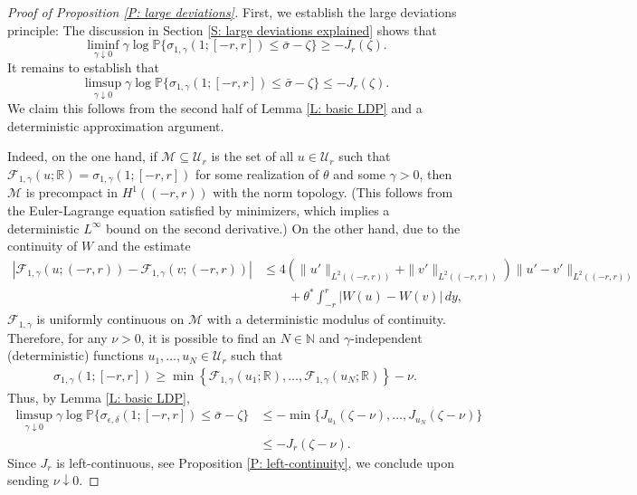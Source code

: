 \documentclass[10pt,a4paper]{amsart}
\begin{document}
	\begin{proof}[Proof of Proposition \ref{P: large deviations}] First, we establish the large deviations principle: The discussion in Section \ref{S: large deviations explained} shows that 
    \begin{equation*}
        \liminf_{\gamma \downarrow 0 } \gamma \log \mathbb{P} \{ \sigma_{1,\gamma}(1;[-r,r]) \leq \bar{\sigma} - \zeta \} \geq - J_{r}(\zeta).
    \end{equation*}
    It remains to establish that
    \begin{equation*}
        \limsup_{\gamma \downarrow 0} \gamma \log \mathbb{P} \{ \sigma_{1,\gamma}(1;[-r,r]) \leq \bar{\sigma} - \zeta \} \leq - J_{r}(\zeta).
    \end{equation*}
   We claim this follows from the second half of Lemma \ref{L: basic LDP} and a deterministic approximation argument.
    
    Indeed, on the one hand, if $\mathcal{M} \subseteq \mathcal{U}_{r}$ is the set of all $u \in \mathcal{U}_{r}$ such that $\mathscr{F}_{1,\gamma}(u;\mathbb{R}) = \sigma_{1,\gamma}(1;[-r,r])$ for some realization of $\theta$ and some $\gamma > 0$, then $\mathcal{M}$ is precompact in $H^{1}((-r,r))$ with the norm topology.  (This follows from the Euler-Lagrange equation satisfied by minimizers, which implies a deterministic $L^{\infty}$ bound on the second derivative.)  On the other hand, due to the continuity of $W$ and the estimate 
        \begin{align*}
            | \mathscr{F}_{1,\gamma}(u;(-r,r)) - \mathscr{F}_{1,\gamma}(v;(-r,r)) | &\leq 4 ( \| u' \|_{L^{2}((-r,r))} + \|v'\|_{L^{2}((-r,r))} ) \| u' - v' \|_{L^{2}((-r,r))} \\
            &\qquad + \theta^{*} \int_{-r}^{r} | W(u) - W(v) | \, dy,
        \end{align*}
        $\mathscr{F}_{1,\gamma}$ is uniformly continuous on $\mathcal{M}$ with a deterministic modulus of continuity.  Therefore, for any $\nu > 0$, it is possible to find an $N \in \mathbb{N}$ and $\gamma$-independent (deterministic) functions $u_{1},\dots,u_{N} \in \mathcal{U}_{r}$ such that 
			\begin{align*}
				\sigma_{1,\gamma}(1; [-r,r]) \geq \min \left\{ \mathscr{F}_{1,\gamma}(u_{1};\mathbb{R}), \dots, \mathscr{F}_{1,\gamma}(u_{N};\mathbb{R}) \right\} - \nu.
			\end{align*}
        Thus, by Lemma \ref{L: basic LDP},
			\begin{align*}
				\limsup_{ \gamma \downarrow 0 } \gamma \log \mathbb{P} \{ \sigma_{\epsilon,\delta}(1;[-r,r]) \leq \bar{\sigma} - \zeta \} &\leq - \min \{ J_{u_{1}}(\zeta - \nu),\dots,J_{u_{N}}(\zeta - \nu) \} \\
                &\leq - J_{r}(\zeta - \nu).
			\end{align*}
        Since $J_{r}$ is left-continuous, see Proposition \ref{P: left-continuity}, we conclude upon sending $\nu \downarrow 0$.
			

\end{proof}
\end{document}
